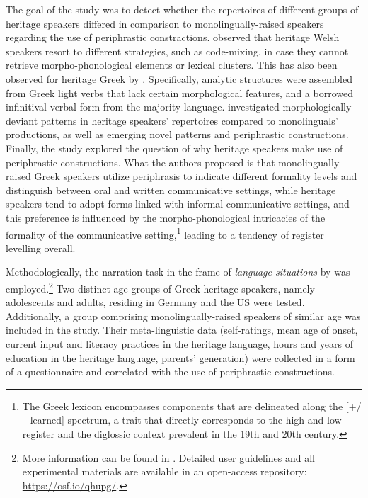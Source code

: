 \documentclass[output=paper,colorlinks,citecolor=brown]{langscibook}
\begin{document}
The goal of the study was to detect whether the repertoires of different groups of heritage speakers differed in comparison to monolingually-raised speakers regarding the use of periphrastic constractions. \textcite{boon2014heritage} observed that heritage Welsh speakers resort to different strategies, such as code-mixing, in case they cannot retrieve morpho-phonological elements or lexical clusters. This has also been observed for heritage Greek by \textcite{alexiadou2018units}. Specifically, analytic structures were assembled from Greek light verbs that lack certain morphological features, and a borrowed infinitival verbal form from the majority language. \textcite{alexiadou2022use} investigated morphologically deviant patterns in heritage speakers' repertoires compared to monolinguals' productions, as well as emerging novel patterns and periphrastic constructions. Finally, the study explored the question of why heritage speakers make use of periphrastic constructions. What the authors proposed is that monolingually-raised Greek speakers utilize periphrasis to indicate different formality levels and distinguish between oral and written communicative settings, while heritage speakers tend to adopt forms linked with informal communicative settings, and this preference is influenced by the morpho-phonological intricacies of the formality of the communicative setting,\footnote{The Greek lexicon encompasses components that are delineated along the [+/−learned] spectrum, a trait that directly corresponds to the high and low register and the diglossic context prevalent in the 19th and 20th century.} leading to a tendency of register levelling overall.

Methodologically, the narration task in the frame of \textit{language situations} by \textcite{wiese2020language} was employed.\footnote{More information can be found in . Detailed user guidelines and all experimental materials are available in an open-access repository: \url{https://osf.io/qhupg/}.} Two distinct age groups of Greek heritage speakers, namely adolescents and adults, residing in Germany and the US were tested. Additionally, a group comprising monolingually-raised speakers of similar age was included in the study. Their meta-linguistic data (self-ratings, mean age of onset, current input and literacy practices in the heritage language, hours and years of education in the heritage language, parents’ generation) were collected in a form of a questionnaire and correlated with the use of periphrastic constructions. 
\end{document}
